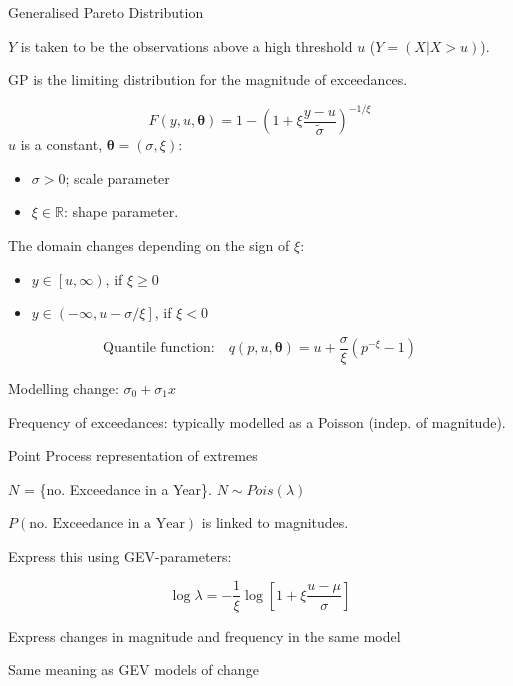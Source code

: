 \documentclass[
  10pt,
  ignorenonframetext,
  compress]{beamer}
\providecommand{\tightlist}{%
  \setlength{\itemsep}{0pt}\setlength{\parskip}{0pt}}
\begin{document}
\begin{frame}{Generalised Pareto Distribution}
\protect\hypertarget{generalised-pareto-distribution}{}

\(Y\) is taken to be the observations above a high threshold \(u\)
(\(Y = (X|X>u)\)).

GP is the limiting distribution for the magnitude of exceedances.

\[F(y, u, \boldsymbol \theta) =  1- \left( 1 + \xi \frac{y-u}{\tilde{\sigma}} \right) ^{-1/\xi}\]
\(u\) is a constant, \(\boldsymbol\theta = (\sigma, \xi)\):

\begin{itemize}
\tightlist
\item
  \(\sigma > 0\); scale parameter
\item
  \(\xi \in \mathbb{R}\): shape parameter.
\end{itemize}

The domain changes depending on the sign of \(\xi\):

\begin{itemize}
\tightlist
\item
  \(y \in \left[u, \infty \right)\), if \(\xi \geq 0\)
\item
  \(y \in \left( -\infty, u -\sigma/\xi \right]\), if \(\xi < 0\)
\end{itemize}

\[ \text{Quantile function:}\quad  q(p, u, \boldsymbol \theta) = u + \frac{\sigma}{\xi} (p^{-\xi} - 1) \]

\pause

Modelling change: \(\sigma_0 + \sigma_1 x\)

\pause

Frequency of exceedances: typically modelled as a Poisson (indep. of
magnitude).

\end{frame}

\begin{frame}{Point Process representation of extremes}
\protect\hypertarget{point-process-representation-of-extremes}{}

\(N\) = \{no. Exceedance in a Year\}. \(N \sim Pois(\lambda)\)

\(P(\text{no. Exceedance in a Year})\) is linked to magnitudes.

Express this using GEV-parameters:

\[\log \lambda = -\frac{1}{\xi} \log\left[1+\xi \frac{u-\mu}{\sigma} \right]\]

\pause

Express changes in magnitude and frequency in the same model

Same meaning as GEV models of change

\end{frame}
\end{document}
